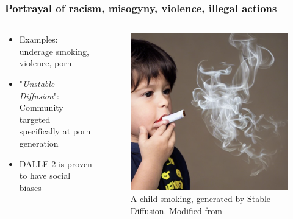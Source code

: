 \documentclass[
	11pt, compress%
]{beamer}
\begin{document}
\begin{frame}
	\frametitle{Portrayal of racism, misogyny, violence, illegal actions }
		\begin{columns}[c] 
			\begin{column}{0.6\textwidth} %
				\begin{itemize}
					\setlength\itemsep{2em}
					\item Examples: underage smoking, violence, porn
					\item "\emph{Unstable Diffusion}": Community targeted specifically at porn generation
					\item DALLE-2 is proven to have social biases 
				\end{itemize}
			\end{column}
			\begin{column}{0.4\textwidth} %
				\begin{figure}
					\includegraphics[width=0.8\linewidth]{Images/kidSmoking.png}
					\caption{\tiny A child smoking, generated by Stable Diffusion. Modified from \cite{https://doi.org/10.48550/arxiv.2212.03507}}
				\end{figure}
			\end{column}
		\end{columns}
\end{frame}
\end{document}

